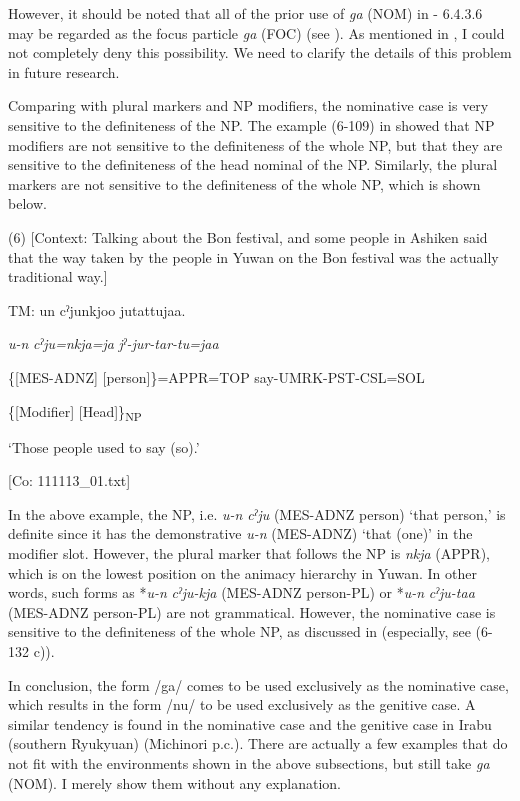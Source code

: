 However, it should be noted that all of the prior use of \textit{ga} (NOM) in  - 6.4.3.6 may be regarded as the focus particle \textit{ga} (FOC) (see ). As mentioned in , I could not completely deny this possibility. We need to clarify the details of this problem in future research.

Comparing with plural markers and NP modifiers, the nominative case is very sensitive to the definiteness of the NP. The example (6-109) in  showed that NP modifiers are not sensitive to the definiteness of the whole NP, but that they are sensitive to the definiteness of the head nominal of the NP. Similarly, the plural markers are not sensitive to the definiteness of the whole NP, which is shown below.

(6)  [Context: Talking about the Bon festival, and some people in Ashiken said that the way taken by the people in Yuwan on the Bon festival was the actually traditional way.]

  TM:  un  cˀjunkjoo  jutattujaa.

    \textit{u-n}  \textit{cˀju=nkja=ja}  \textit{jˀ-jur-tar-tu=jaa}

    \{[MES-ADNZ]  [person]\}=APPR=TOP  say-UMRK-PST-CSL=SOL

    \{[Modifier]  [Head]\}\textsubscript{NP}  

    ‘Those people used to say (so).’

    [Co: 111113\_01.txt]

In the above example, the NP, i.e. \textit{u-n} \textit{cˀju} (MES-ADNZ person) ‘that person,’ is definite since it has the demonstrative \textit{u-n} (MES-ADNZ) ‘that (one)’ in the modifier slot. However, the plural marker that follows the NP is \textit{nkja} (APPR), which is on the lowest position on the animacy hierarchy in Yuwan. In other words, such forms as *\textit{u-n} \textit{cˀju-kja} (MES-ADNZ person-PL) or *\textit{u-n} \textit{cˀju-taa} (MES-ADNZ person-PL) are not grammatical. However, the nominative case is sensitive to the definiteness of the whole NP, as discussed in  (especially, see (6-132 c)).

  In conclusion, the form /ga/ comes to be used exclusively as the nominative case, which results in the form /nu/ to be used exclusively as the genitive case. A similar tendency is found in the nominative case and the genitive case in Irabu (southern Ryukyuan) (Michinori \citealt{Shimoji2013} p.c.). There are actually a few examples that do not fit with the environments shown in the above subsections, but still take \textit{ga} (NOM). I merely show them without any explanation.

